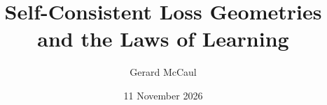 \documentclass[aps,prx,reprint,floatfix,superscriptaddress,nofootinbib]{revtex4-2}
\begin{document}
\title{Self-Consistent Loss Geometries and the Laws of Learning}
\author{Gerard McCaul}
\date{11 November 2026}
\begin{abstract}

\end{abstract}
\maketitle





\clearpage

\clearpage


\appendix



\end{document}
